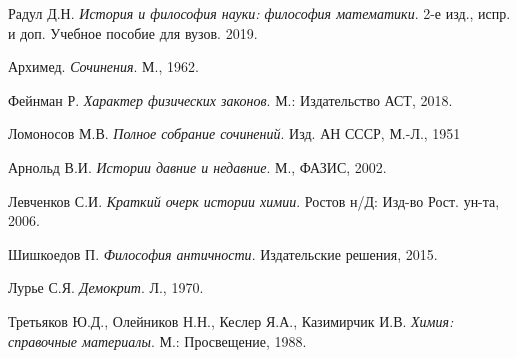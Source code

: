 \begin{thebibliography}{9}

Радул Д.Н. 
\textit{История и философия науки: философия математики}. 2-е изд., испр. и доп. Учебное пособие для вузов. 2019.

Архимед.
\textit{Сочинения}. М., 1962.

Фейнман Р.
\textit{Характер физических законов}. М.: Издательство АСТ, 2018.

Ломоносов М.В.
\textit{Полное собрание сочинений}. Изд. АН СССР, М.-Л., 1951

Арнольд В.И.
\textit{Истории давние и недавние}. М., ФАЗИС, 2002.

Левченков С.И.
\textit{Краткий очерк истории химии}. Ростов н/Д: Изд-во Рост. ун-та, 2006.

Шишкоедов П.
\textit{Философия античности}. Издательские решения, 2015.

Лурье С.Я.
\textit{Демокрит}. Л., 1970.

Третьяков Ю.Д., Олейников Н.Н., Кеслер Я.А., Казимирчик И.В.
\textit{Химия: справочные материалы}. М.: Просвещение, 1988.

\end{thebibliography}
